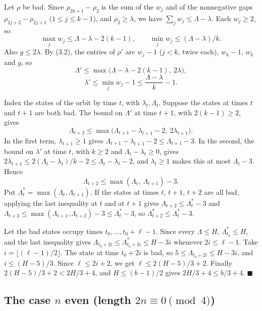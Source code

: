 \documentclass[11pt,letterpaper]{article}
\theoremstyle{paperstyle}
\theoremstyle{paperstyledef}
\theoremstyle{paperstylerem}
\begin{document}
Let \(\rho\) be bad. Since \(\rho_{2k+1} - \rho_2\) is the sum of the \(w_j\) and of the nonnegative gaps \(\rho_{2j+2} - \rho_{2j+1}\) (\(1 \leq j \leq k-1\)), and \(\rho_2 \geq \lambda\), we have \(\sum_j w_j \leq \Lambda - \lambda\). Each \(w_j \geq 2\), so \[\max_j w_j \leq \Lambda - \lambda - 2(k-1), \qquad \min_j w_j \leq (\Lambda - \lambda)/k.\] Also \(g \leq 2\lambda\). By (3.2), the entries of \(\rho'\) are \(w_j - 1\) (\(j < k\), twice each), \(w_k - 1\), \(w_k\) and \(g\), so \[\Lambda' \leq \max\bigl(\Lambda - \lambda - 2(k-1),\ 2\lambda\bigr),\] \[\lambda' \leq \min_j w_j - 1 \leq \frac{\Lambda - \lambda}{k} - 1.\]

Index the states of the orbit by time \(t\), with \(\lambda_t, \Lambda_t\). Suppose the states at times \(t\) and \(t+1\) are both bad. The bound on \(\Lambda'\) at time \(t+1\), with \(2(k-1) \geq 2\), gives \[\Lambda_{t+2} \leq \max\bigl(\Lambda_{t+1} - \lambda_{t+1} - 2,\ 2\lambda_{t+1}\bigr).\] In the first term, \(\lambda_{t+1} \geq 1\) gives \(\Lambda_{t+1} - \lambda_{t+1} - 2 \leq \Lambda_{t+1} - 3\). In the second, the bound on \(\lambda'\) at time \(t\), with \(k \geq 2\) and \(\Lambda_t - \lambda_t \geq 0\), gives \(2\lambda_{t+1} \leq 2(\Lambda_t - \lambda_t)/k - 2 \leq \Lambda_t - \lambda_t - 2\), and \(\lambda_t \geq 1\) makes this at most \(\Lambda_t - 3\). Hence \[\Lambda_{t+2} \leq \max(\Lambda_t,\ \Lambda_{t+1}) - 3.\] Put \(\Lambda^*_t = \max(\Lambda_t, \Lambda_{t+1})\). If the states at times \(t\), \(t+1\), \(t+2\) are all bad, applying the last inequality at \(t\) and at \(t+1\) gives \(\Lambda_{t+2} \leq \Lambda^*_t - 3\) and \(\Lambda_{t+3} \leq \max(\Lambda_{t+1}, \Lambda_{t+2}) - 3 \leq \Lambda^*_t - 3\), so \(\Lambda^*_{t+2} \leq \Lambda^*_t - 3\).

Let the bad states occupy times \(t_0, \dots, t_0 + \ell - 1\). Since every \(\Lambda \leq H\), \(\Lambda^*_{t_0} \leq H\), and the last inequality gives \(\Lambda_{t_0 + 2i} \leq \Lambda^*_{t_0 + 2i} \leq H - 3i\) whenever \(2i \leq \ell - 1\). Take \(i = \lfloor (\ell-1)/2 \rfloor\). The state at time \(t_0 + 2i\) is bad, so \(5 \leq \Lambda_{t_0+2i} \leq H - 3i\), and \(i \leq (H - 5)/3\). Since \(\ell \leq 2i + 2\), we get \(\ell \leq 2(H-5)/3 + 2\). Finally \(2(H-5)/3 + 2 < 2H/3 + 4\), and \(H \leq (b-1)/2\) gives \(2H/3 + 4 \leq b/3 + 4\). \(\blacksquare\)

\subsection{\texorpdfstring{The case \(n\) even (length \(2n \equiv 0 \pmod 4\))}{The case n even (length 2n \textbackslash equiv 0 \textbackslash pmod 4)}}\label{the-case-n-even-length-2n-equiv-0-pmod-4}
\end{document}
